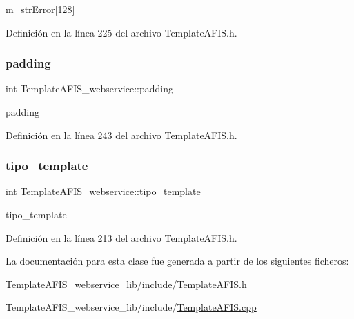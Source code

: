 m\+\_\+str\+Error\mbox{[}128\mbox{]} 



Definición en la línea 225 del archivo Template\+A\+F\+I\+S.\+h.

\hypertarget{classTemplateAFIS__webservice_a5be66b367a1276c21ffc3450c1f69643}{}\label{classTemplateAFIS__webservice_a5be66b367a1276c21ffc3450c1f69643} 
\subsubsection{\texorpdfstring{padding}{padding}}
{\footnotesize\ttfamily int Template\+A\+F\+I\+S\+\_\+webservice\+::padding\hspace{0.3cm}{\ttfamily [private]}}



padding 



Definición en la línea 243 del archivo Template\+A\+F\+I\+S.\+h.

\hypertarget{classTemplateAFIS__webservice_a955d31aac4c820b4399ccbafe1b59b63}{}\label{classTemplateAFIS__webservice_a955d31aac4c820b4399ccbafe1b59b63} 
\subsubsection{\texorpdfstring{tipo\+\_\+template}{tipo\_template}}
{\footnotesize\ttfamily int Template\+A\+F\+I\+S\+\_\+webservice\+::tipo\+\_\+template\hspace{0.3cm}{\ttfamily [private]}}



tipo\+\_\+template 



Definición en la línea 213 del archivo Template\+A\+F\+I\+S.\+h.



La documentación para esta clase fue generada a partir de los siguientes ficheros\+:\begin{DoxyCompactItemize}
\item 
Template\+A\+F\+I\+S\+\_\+webservice\+\_\+lib/include/\hyperlink{TemplateAFIS_8h}{Template\+A\+F\+I\+S.\+h}\item 
Template\+A\+F\+I\+S\+\_\+webservice\+\_\+lib/include/\hyperlink{TemplateAFIS_8cpp}{Template\+A\+F\+I\+S.\+cpp}\end{DoxyCompactItemize}
